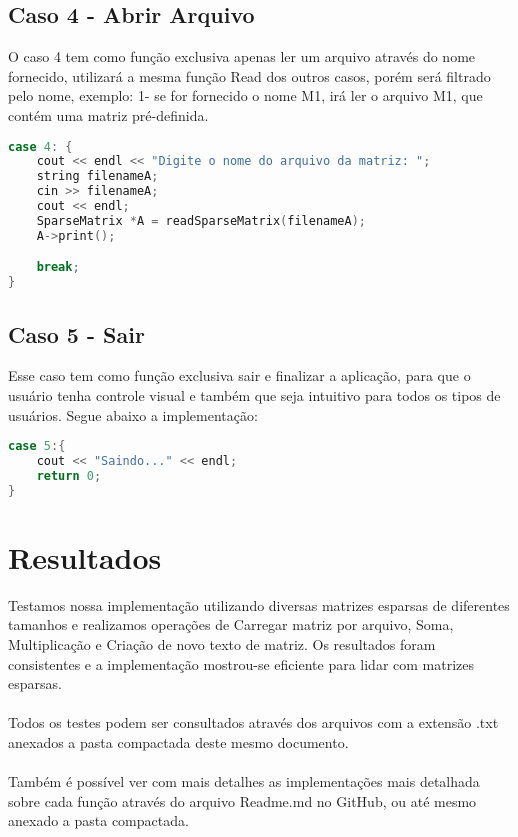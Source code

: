 \documentclass[a4paper,12pt]{article}
\begin{document}
\subsection{Caso 4 - Abrir Arquivo}
O caso 4 tem como função exclusiva apenas ler um arquivo através do nome fornecido, utilizará a mesma função Read dos outros casos, porém será filtrado pelo nome, exemplo: 1- se for fornecido o nome M1, irá ler o arquivo M1, que contém uma matriz pré-definida.
\begin{lstlisting}[language=C++]
case 4: {
    cout << endl << "Digite o nome do arquivo da matriz: ";
    string filenameA;
    cin >> filenameA;
    cout << endl;
    SparseMatrix *A = readSparseMatrix(filenameA);
    A->print();

    break;
}
\end{lstlisting}

\subsection{Caso 5 - Sair}

Esse caso tem como função exclusiva sair e finalizar a aplicação, para que o usuário tenha controle visual e também que seja intuitivo para todos os tipos de usuários. Segue abaixo a implementação:
\begin{lstlisting}[language=C++]
case 5:{
    cout << "Saindo..." << endl;
    return 0;
}
\end{lstlisting}

\section{Resultados}

Testamos nossa implementação utilizando diversas matrizes esparsas de diferentes tamanhos e realizamos operações de Carregar matriz por arquivo, Soma, Multiplicação e Criação de novo texto de matriz. Os resultados foram consistentes e a implementação mostrou-se eficiente para lidar com matrizes esparsas.
\\\\
Todos os testes podem ser consultados através dos arquivos com a extensão .txt anexados a pasta compactada deste mesmo documento.
\\\\
Também é possível ver com mais detalhes as implementações mais detalhada sobre cada função através do arquivo Readme.md no GitHub, ou até mesmo anexado a pasta compactada.
\end{document}
